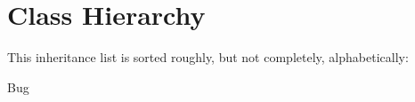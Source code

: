 \section{Class Hierarchy}
This inheritance list is sorted roughly, but not completely, alphabetically\-:\begin{DoxyCompactList}
\item {}
\item {}
\item Bug\begin{DoxyCompactList}
\item {}
\begin{DoxyCompactList}
\item {}
\end{DoxyCompactList}
\end{DoxyCompactList}
\end{DoxyCompactList}
